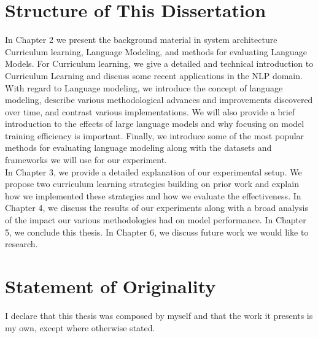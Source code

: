 \section{Structure of This Dissertation}
In Chapter 2 we present the background material in system architecture Curriculum learning, Language Modeling, and methods for evaluating Language Models. For Curriculum learning, we give a detailed and technical introduction to Curriculum Learning and discuss some recent applications in the NLP domain. With regard to Language modeling, we introduce the concept of language modeling, describe various methodological advances and improvements discovered over time, and contrast various implementations. We will also provide a brief introduction to the effects of large language models and why focusing on model training efficiency is important. Finally, we introduce some of the most popular methods for evaluating language modeling along with the datasets and frameworks we will use for our experiment. \\
In Chapter 3, we provide a detailed explanation of our experimental setup. We propose two curriculum learning strategies building on prior work and explain how we implemented these strategies and how we evaluate the effectiveness. 
In Chapter 4, we discuss the results of our experiments along with a broad analysis of the impact our various methodologies had on model performance.
In Chapter 5, we conclude this thesis.
In Chapter 6, we discuss future work we would like to research.
\section{Statement of Originality}
I declare that this thesis was composed by myself and that the work it presents is my own, except where otherwise stated.